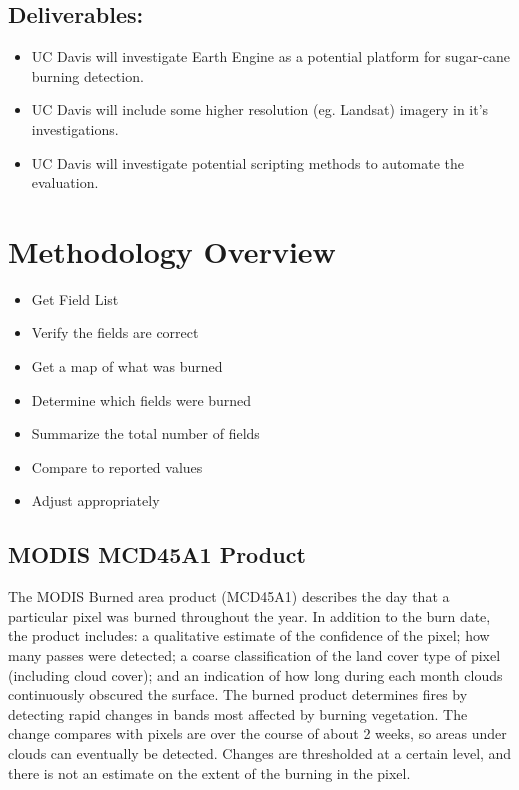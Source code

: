\documentclass[]{article}
\begin{document}
\subsection{Deliverables:}\label{deliverables-3}

\begin{itemize}
\itemsep1pt\parskip0pt
\item
  UC Davis will investigate Earth Engine as a potential platform for
  sugar-cane burning detection.
\item
  UC Davis will include some higher resolution (eg. Landsat) imagery in
  it's investigations.
\item
  UC Davis will investigate potential scripting methods to automate the
  evaluation.
\end{itemize}

\section{Methodology Overview}\label{methodology-overview}

\begin{itemize}
\itemsep1pt\parskip0pt
\item
  Get Field List
\item
  Verify the fields are correct
\item
  Get a map of what was burned
\item
  Determine which fields were burned
\item
  Summarize the total number of fields
\item
  Compare to reported values
\item
  Adjust appropriately
\end{itemize}

\subsection{MODIS MCD45A1 Product}\label{modis-mcd45a1-product}

The MODIS Burned area product (MCD45A1) describes the day that a
particular pixel was burned throughout the year. In addition to the burn
date, the product includes: a qualitative estimate of the confidence of
the pixel; how many passes were detected; a coarse classification of the
land cover type of pixel (including cloud cover); and an indication of
how long during each month clouds continuously obscured the surface. The
burned product determines fires by detecting rapid changes in bands most
affected by burning vegetation. The change compares with pixels are over
the course of about 2 weeks, so areas under clouds can eventually be
detected. Changes are thresholded at a certain level, and there is not
an estimate on the extent of the burning in the pixel.
\end{document}
